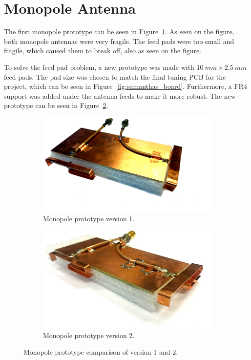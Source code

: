 \section{Monopole Antenna}
The first monopole prototype can be seen in Figure~\ref{fig:ant1_proto1_3d}. As seen on the figure, both monopole antennas were very fragile. The feed pads were too small and fragile, which caused them to break off, also as seen on the figure.

To solve the feed pad problem, a new prototype was made with $\SI{10}{mm}\times \SI{2.5}{mm}$ feed pads. The pad size was chosen to match the final tuning PCB for the project, which can be seen in Figure~\ref{fig:samanthas_board}. Furthermore, a FR4 support was added under the antenna feeds to make it more robust. The new prototype can be seen in Figure~\ref{fig:ant1_proto2_3d}.

\begin{figure}[htbp]
  \begin{subfigure}[b]{0.49\linewidth}
        \centering
        \includegraphics[scale=0.2]{img/tech_sol/monopole/prototype_v1/monopole_v1}
        \caption{Monopole prototype version 1.}
        \label{fig:ant1_proto1_3d}
    \end{subfigure}
    \hfill
    \begin{subfigure}[b]{0.49\linewidth}
        \centering
        \includegraphics[scale=0.27]{img/tech_sol/monopole/prototype_v2/monopole_v2}
        \caption{Monopole prototype version 2.}
        \label{fig:ant1_proto2_3d}
    \end{subfigure}
    \caption{Monopole prototype comparison of version 1 and 2.}
    \label{fig:ant_1_proto_3d}
\end{figure}

